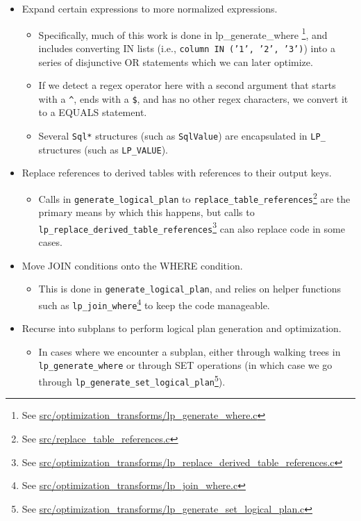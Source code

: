 \documentclass[]{article}
\def\code#1{\texttt{#1}}
\newcommand{\gitlab}[1]{\footnote{See \href{https://gitlab.com/YottaDB/DBMS/YDBOcto/blob/master/#1}{#1}}}
\begin{document}
\begin{itemize}
	\item Expand certain expressions to more normalized expressions.
	\begin{itemize}
		\item Specifically, much of this work is done in lp\_generate\_where \gitlab{src/optimization\_transforms/lp\_generate\_where.c}, and includes converting IN lists (i.e., \code{column\ IN\ ('1', '2', '3')}) into a series of disjunctive OR statements which we can later optimize.
		\item If we detect a regex operator here with a second argument that starts with a \code{\^}, ends with a \code{\$}, and has no other regex characters, we convert it to a EQUALS statement.
		\item Several \code{Sql*} structures (such as \code{SqlValue}) are encapsulated in \code{LP\_} structures (such as \code{LP\_VALUE}).
	\end{itemize}
	\item Replace references to derived tables with references to their output keys.
	\begin{itemize}
		\item Calls in \code{generate\_logical\_plan} to \code{replace\_table\_references}\gitlab{src/replace\_table\_references.c} are the primary means by which this happens, but calls to \\ \code{lp\_replace\_derived\_table\_references}\gitlab{src/optimization\_transforms/lp\_replace\_derived\_table\_references.c} can also replace code in some cases.
	\end{itemize}
	\item Move JOIN conditions onto the WHERE condition.
	\begin{itemize}
		\item This is done in \code{generate\_logical\_plan}, and relies on helper functions such as \code{lp\_join\_where}\gitlab{src/optimization\_transforms/lp\_join\_where.c} to keep the code manageable.
	\end{itemize}
	\item Recurse into subplans to perform logical plan generation and optimization.
	\begin{itemize}
		\item In cases where we encounter a subplan, either through walking trees in \code{lp\_generate\_where} or through SET operations (in which case we go through \code{lp\_generate\_set\_logical\_plan}\gitlab{src/optimization\_transforms/lp\_generate\_set\_logical\_plan.c}).
	\end{itemize}
\end{itemize}
\end{document}
